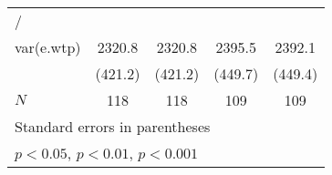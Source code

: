 {\begin{tabular}{l*{4}{c}}
\hline
/         &                  &                  &                  &                  \\
var(e.wtp)&   2320.8\sym{***}&   2320.8\sym{***}&   2395.5\sym{***}&   2392.1\sym{***}\\
          &  (421.2)         &  (421.2)         &  (449.7)         &  (449.4)         \\
\hline
\(N\)     &      118         &      118         &      109         &      109         \\
\hline\hline
\multicolumn{5}{l}{\footnotesize Standard errors in parentheses}\\
\multicolumn{5}{l}{\footnotesize \sym{*} \(p<0.05\), \sym{**} \(p<0.01\), \sym{***} \(p<0.001\)}\\
\end{tabular}
}
